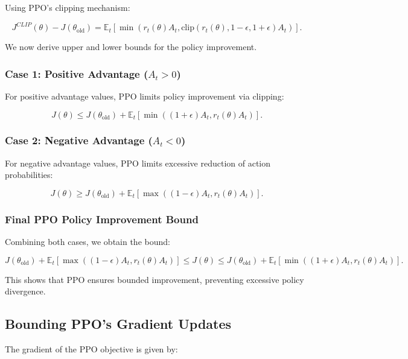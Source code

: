 \documentclass[12pt]{extreport} %
\begin{document}
Using PPO's clipping mechanism:

\begin{equation}
J^{CLIP}(\theta) - J(\theta_{\text{old}}) = \mathbb{E}_t \left[ \min(r_t(\theta) A_t, \text{clip}(r_t(\theta), 1-\epsilon, 1+\epsilon) A_t ) \right].
\end{equation}

We now derive upper and lower bounds for the policy improvement.

\subsubsection{Case 1: Positive Advantage ($A_t > 0$)}
For positive advantage values, PPO limits policy improvement via clipping:

\begin{equation}
J(\theta) \leq J(\theta_{\text{old}}) + \mathbb{E}_t \left[ \min((1 + \epsilon) A_t, r_t(\theta) A_t) \right].
\end{equation}

\subsubsection{Case 2: Negative Advantage ($A_t < 0$)}
For negative advantage values, PPO limits excessive reduction of action probabilities:

\begin{equation}
J(\theta) \geq J(\theta_{\text{old}}) + \mathbb{E}_t \left[ \max((1 - \epsilon) A_t, r_t(\theta) A_t) \right].
\end{equation}

\subsubsection{Final PPO Policy Improvement Bound}
Combining both cases, we obtain the bound:

\begin{equation}
J(\theta_{\text{old}}) + \mathbb{E}_t \left[ \max((1 - \epsilon) A_t, r_t(\theta) A_t) \right] \leq J(\theta) \leq J(\theta_{\text{old}}) + \mathbb{E}_t \left[ \min((1 + \epsilon) A_t, r_t(\theta) A_t) \right].
\end{equation}

This shows that PPO ensures bounded improvement, preventing excessive policy divergence.

\subsection{Bounding PPO's Gradient Updates}
The gradient of the PPO objective is given by:
\end{document}
